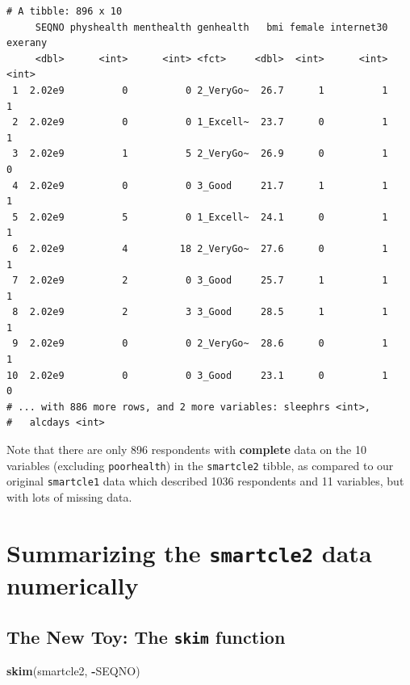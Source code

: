 \documentclass[]{book}
\newenvironment{Shaded}{\begin{snugshade}}{\end{snugshade}}
\newcommand{\KeywordTok}[1]{\textcolor[rgb]{0.13,0.29,0.53}{\textbf{#1}}}
\newcommand{\OperatorTok}[1]{\textcolor[rgb]{0.81,0.36,0.00}{\textbf{#1}}}
\newcommand{\NormalTok}[1]{#1}
\theoremstyle{definition}
\theoremstyle{definition}
\theoremstyle{definition}
\theoremstyle{remark}
\begin{document}
\begin{verbatim}
# A tibble: 896 x 10
     SEQNO physhealth menthealth genhealth   bmi female internet30 exerany
     <dbl>      <int>      <int> <fct>     <dbl>  <int>      <int>   <int>
 1  2.02e9          0          0 2_VeryGo~  26.7      1          1       1
 2  2.02e9          0          0 1_Excell~  23.7      0          1       1
 3  2.02e9          1          5 2_VeryGo~  26.9      0          1       0
 4  2.02e9          0          0 3_Good     21.7      1          1       1
 5  2.02e9          5          0 1_Excell~  24.1      0          1       1
 6  2.02e9          4         18 2_VeryGo~  27.6      0          1       1
 7  2.02e9          2          0 3_Good     25.7      1          1       1
 8  2.02e9          2          3 3_Good     28.5      1          1       1
 9  2.02e9          0          0 2_VeryGo~  28.6      0          1       1
10  2.02e9          0          0 3_Good     23.1      0          1       0
# ... with 886 more rows, and 2 more variables: sleephrs <int>,
#   alcdays <int>
\end{verbatim}

Note that there are only 896 respondents with \textbf{complete} data on
the 10 variables (excluding \texttt{poorhealth}) in the
\texttt{smartcle2} tibble, as compared to our original
\texttt{smartcle1} data which described 1036 respondents and 11
variables, but with lots of missing data.

\section{\texorpdfstring{Summarizing the \texttt{smartcle2} data
numerically}{Summarizing the smartcle2 data numerically}}\label{summarizing-the-smartcle2-data-numerically}

\subsection{\texorpdfstring{The New Toy: The \texttt{skim}
function}{The New Toy: The skim function}}\label{the-new-toy-the-skim-function}

\begin{Shaded}
\begin{Highlighting}[]
\KeywordTok{skim}\NormalTok{(smartcle2, }\OperatorTok{-}\NormalTok{SEQNO)}
\end{Highlighting}
\end{Shaded}
\end{document}
